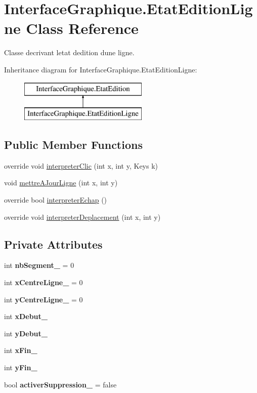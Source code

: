 \hypertarget{class_interface_graphique_1_1_etat_edition_ligne}{}\section{Interface\+Graphique.\+Etat\+Edition\+Ligne Class Reference}
\label{class_interface_graphique_1_1_etat_edition_ligne}


Classe decrivant l\textquotesingle{}etat d\textquotesingle{}edition d\textquotesingle{}une ligne.  


Inheritance diagram for Interface\+Graphique.\+Etat\+Edition\+Ligne\+:\begin{figure}[H]
\begin{center}
\leavevmode
\includegraphics[height=2.000000cm]{class_interface_graphique_1_1_etat_edition_ligne}
\end{center}
\end{figure}
\subsection*{Public Member Functions}
\begin{DoxyCompactItemize}
\item 
override void \hyperlink{group__inf2990_ga8c2be724327977a66650e6987423b95d}{interpreter\+Clic} (int x, int y, Keys k)
\item 
void \hyperlink{group__inf2990_ga208ebe152302ec750de1485e0589b34f}{mettre\+A\+Jour\+Ligne} (int x, int y)
\item 
override bool \hyperlink{group__inf2990_ga77ffb80cb55a5ef9c31c3ebebcf3db16}{interpreter\+Echap} ()
\item 
override void \hyperlink{group__inf2990_gac11a3b90a64b159ac00c59d2fcb349d8}{interpreter\+Deplacement} (int x, int y)
\end{DoxyCompactItemize}
\subsection*{Private Attributes}
\begin{DoxyCompactItemize}
\item 
int {\bfseries nb\+Segment\+\_\+} = 0
\item 
int {\bfseries x\+Centre\+Ligne\+\_\+} = 0
\item 
int {\bfseries y\+Centre\+Ligne\+\_\+} = 0
\item 
int {\bfseries x\+Debut\+\_\+}
\item 
int {\bfseries y\+Debut\+\_\+}
\item 
int {\bfseries x\+Fin\+\_\+}
\item 
int {\bfseries y\+Fin\+\_\+}
\item 
bool {\bfseries activer\+Suppression\+\_\+} = false
\end{DoxyCompactItemize}
